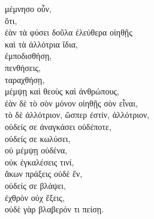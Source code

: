 
{\large
\begin{greek}
\noindent μέμνησο οὖν, \\
\tabto{2em} ὅτι, \\
\tabto{4em} ἐὰν τὰ φύσει δοῦλα ἐλεύθερα οἰηθῇς \\
\tabto{4em} καὶ τὰ ἀλλότρια ἴδια, \\
\tabto{2em} ἐμποδισθήσῃ, \\
\tabto{2em} πενθήσεις, \\
\tabto{2em} ταραχθήσῃ, \\
\tabto{2em} μέμψῃ καὶ θεοὺς καὶ ἀνθρώπους, \\
\tabto{4em} ἐὰν δὲ τὸ σὸν μόνον οἰηθῇς σὸν εἶναι, \\
\tabto{4em} τὸ δὲ ἀλλότριον, ὥσπερ ἐστίν, ἀλλότριον, \\
\tabto{2em} οὐδείς σε ἀναγκάσει οὐδέποτε, \\
\tabto{2em} οὐδείς σε κωλύσει, \\
\tabto{2em} οὐ μέμψῃ οὐδένα, \\
\tabto{2em} οὐκ ἐγκαλέσεις τινί, \\
\tabto{2em} ἄκων πράξεις οὐδὲ ἕν, \\
\tabto{2em} οὐδείς σε βλάψει, \\
\tabto{2em} ἐχθρὸν οὐχ ἕξεις, \\
\tabto{2em} οὐδὲ γὰρ βλαβερόν τι πείσῃ.\\

\end{greek}
}

